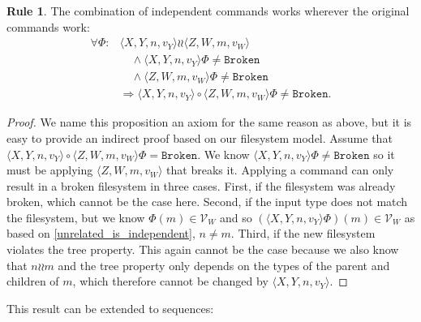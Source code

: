 \documentclass[12pt]{article}
\newcommand{\setvx}[1]{\mathcal{V}_{#1}} %
\newcommand{\fsbroken}{\mathtt{Broken}} %
\newcommand{\FS}{\Phi} %
\newcommand{\valvy}{v_Y} %
\newcommand{\valvw}{v_W}
\newcommand{\caaaa}[4]{\langle{#1,#2,#3,#4}\rangle}
\newcommand{\cxynv}{\caaaa{X}{Y}{n}{\valvy}}
\newcommand{\czwmv}{\caaaa{Z}{W}{m}{\valvw}}
\newcommand{\cc}{\circ} %
\newcommand{\indep}{\mathrel{\wr\wr}} %
\newcommand{\unrel}{\indep} %
\theoremstyle{definition}
\newtheorem{myax}{Rule}
\begin{document}
\begin{myax}\label{combine_independent_commands}
The combination of independent commands works wherever the original commands work:
\begin{align*}
\forall\FS: &\cxynv\indep \czwmv \\
&\quad\wedge \cxynv\FS\neq\fsbroken \\
&\quad\wedge \czwmv\FS\neq\fsbroken \\
&\Rightarrow \cxynv\cc \czwmv\FS\neq\fsbroken.
\end{align*}
\end{myax}
\begin{proof}
We name this proposition an axiom for the same reason as above,
but it is easy to provide an indirect proof based on our filesystem model.
Assume that $\cxynv\cc \czwmv\FS=\fsbroken$.
We know $\cxynv\FS\neq\fsbroken$ so it must be applying 
$\czwmv$ that breaks it.
Applying a command can only result in a broken filesystem in three cases.
First, if the filesystem was already broken, which cannot be the case here.
Second, if the input type does not match the filesystem,
but we know $\FS(m)\in\setvx{W}$ and so
$(\cxynv\FS)(m)\in\setvx{W}$ as based on \cref{unrelated_is_independent}, $n\neq m$.
Third, if the new filesystem violates the tree property.
This again cannot be the case because we also know that $n\unrel m$
and the tree property only depends on the types of the parent and children of $m$,
which therefore cannot be changed by $\cxynv$.
\end{proof}

This result can be extended to sequences:
\end{document}
